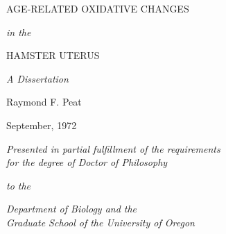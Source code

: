 \newpage

\thispagestyle{empty}

\vspace*{\fill}

\begin{center}
    
{\fontsize{22.5}{0}\selectfont AGE-RELATED OXIDATIVE CHANGES}

\vspace*{\baselineskip}

{\Large \textit{in the}}

\vspace*{\baselineskip}

{\fontsize{22.5}{0}\selectfont HAMSTER UTERUS}

\vspace*{2\baselineskip}

{\large\adfhangingflatleafleft}

\vspace*{2\baselineskip}

{\Large\textit{A Dissertation}}

\vspace*{4\baselineskip}

{\Large Raymond F. Peat

\vspace*{0.5\baselineskip}

September, 1972
}

\vspace*{4\baselineskip}

{\large\textit{Presented in partial fulfillment of the requirements\\for the degree of Doctor of Philosophy}}

\vspace*{0.75\baselineskip}

{\large\textit{to the}}

\vspace*{0.5\baselineskip}

{\large\textit{Department of Biology and the\\Graduate School of the University of Oregon}}

\end{center}

\vspace*{\fill}
